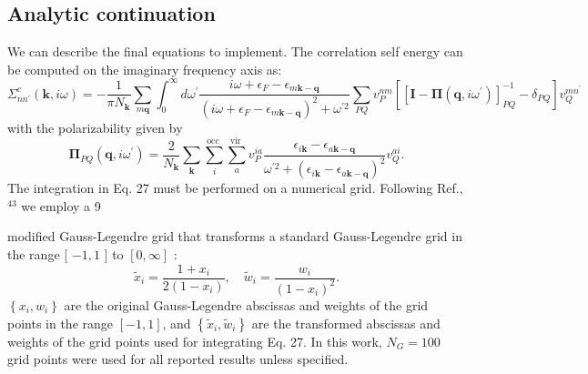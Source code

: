 \subsection{Analytic continuation}
\label{sec:analytic_continuation}
We can describe the final equations to implement. The correlation self energy can be computed on the imaginary frequency axis as:
\begin{equation}
    \Sigma_{n n^{\prime}}^c(\mathbf{k}, i \omega)= -\frac{1}{\pi N_{\mathbf{k}}} \sum_{m \mathbf{q}} \int_0^{\infty} d \omega^{\prime} \frac{i \omega+\epsilon_F-\epsilon_{m \mathbf{k}-\mathbf{q}}}{\left(i \omega+\epsilon_F-\epsilon_{m \mathbf{k}-\mathbf{q}}\right)^2+\omega^{\prime 2}} \sum_{P Q} v_P^{n m}\left[\left[\mathbf{I}-\mathbf{\Pi}\left(\mathbf{q}, i \omega^{\prime}\right)\right]_{P Q}^{-1}-\delta_{P Q}\right] v_Q^{m n^{\prime}}
\end{equation}
with the polarizability given by
\begin{equation}
\boldsymbol{\Pi}_{P Q}\left(\mathbf{q}, i \omega^{\prime}\right)=\frac{2}{N_{\mathbf{k}}} \sum_{\mathbf{k}} \sum_i^{\text {occ }} \sum_a^{\text {vir }} v_P^{i a} \frac{\epsilon_{i \mathbf{k}}-\epsilon_{a \mathbf{k}-\mathbf{q}}}{\omega^{\prime 2}+\left(\epsilon_{i \mathbf{k}}-\epsilon_{a \mathbf{k}-\mathbf{q}}\right)^2} v_Q^{a i}.
\end{equation}
The integration in Eq. 27 must be performed on a numerical grid. Following Ref., ${ }^{43}$ we employ a
9

modified Gauss-Legendre grid that transforms a standard Gauss-Legendre grid in the range [ $-1,1$ ] to $[0, \infty]$ :
$$
\tilde{x}_i=\frac{1+x_i}{2\left(1-x_i\right)}, \quad \tilde{w}_i=\frac{w_i}{\left(1-x_i\right)^2} .
$$
$\left\{x_i, w_i\right\}$ are the original Gauss-Legendre abscissas and weights of the grid points in the range $[-1,1]$, and $\left\{\tilde{x}_i, \tilde{w}_i\right\}$ are the transformed abscissas and weights of the grid points used for integrating Eq. 27. In this work, $N_G=100$ grid points were used for all reported results unless specified.

